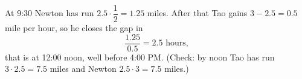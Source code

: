 At 9:30 Newton has run $2.5\cdot\dfrac{1}{2}=1.25$ miles. After that Tao gains $3-2.5=0.5$ mile per hour, so he closes the gap in
\[
\dfrac{1.25}{0.5}=\boxed{2.5\text{ hours}},
\]
that is at 12:00 noon, well before 4:00 PM. (Check: by noon Tao has run $3\cdot2.5=7.5$ miles and Newton $2.5\cdot3=7.5$ miles.)
